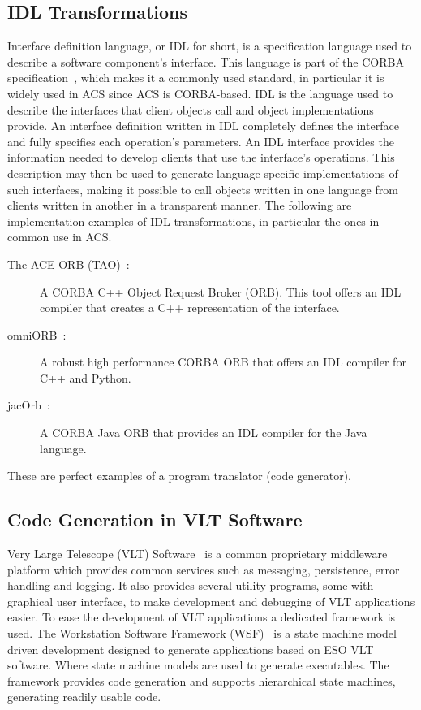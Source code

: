 \subsection{IDL Transformations}
\label{sec:IDL-transformations}
Interface definition language,
or IDL for short,
is a specification language used to describe a software component's interface.
This language is part of the CORBA specification~\cite{CORBA-WEB, OMG-IDL, CORBA-OMG02},
which makes it a commonly used standard,
in particular it is widely used in ACS since ACS is CORBA-based.
IDL is the language used to describe the
interfaces that client objects call and object implementations provide. An interface
definition written in IDL completely defines the interface and fully specifies
each operation’s parameters. An IDL interface provides the information needed
to develop clients that use the interface’s operations.
This description may then be used
to generate language specific implementations of such interfaces,
making it possible to call objects written in one language
from clients written in another in a transparent manner.
The following are implementation examples of IDL transformations,
in particular the ones in common use in ACS.
\begin{description}
\item[The ACE ORB (TAO)~\cite{TAO-WEB}:]
  A CORBA C++ Object Request Broker (ORB).
  This tool offers an IDL compiler that creates a C++ representation
  of the interface.
\item[omniORB~\cite{OMNIORB-WEB}:]
  A robust high performance CORBA ORB that
  offers an IDL compiler for C++ and Python.
\item[jacOrb~\cite{JACORB-WEB}:]
  A CORBA Java ORB that
  provides an IDL compiler for the Java language.
\end{description}
These are perfect examples of a program translator (code generator).

\subsection{Code Generation in VLT Software}
\label{sec:code-generation:VLT}
Very Large Telescope (VLT) Software~\cite{filipi99:_vlt_software}
is a common proprietary middleware platform
which provides common services such as messaging, persistence, error handling and logging.
It also provides several utility programs, some with graphical user interface, to make development and debugging
of VLT applications easier.
To ease the development of VLT applications a dedicated framework is used.
The Workstation Software Framework (WSF)~\cite{andolfato09:_wsf}
is a state machine model driven development
designed to generate applications based on ESO VLT software.
Where state machine models are used to generate executables.
The framework provides code generation and supports hierarchical state machines, generating readily usable code.

